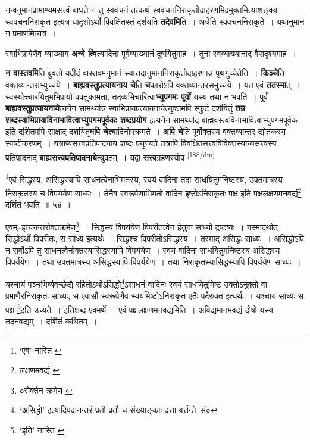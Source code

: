 \documentclass[article,12pt,a4paper]{memoir}
\begin{document}
	  \pstart नन्वनुमानप्रामाण्यमसत्त्वं बाधते न तु स्ववचनं तत्कथं स्ववचननिराकृतोदाहरणमिदमुक्तमित्याशङ्क्य स्ववचननिराकृत इत्यत्र यादृशोऽर्थो विवक्षितस्तं दर्शयति \textbf{तदेवमि}ति । अत्रेति स्ववचननिराकृते । यथानुमानं न प्रमाणमित्यत्र ।
	\pend
      

	  \pstart स्वाभिप्रायेणैव व्याख्याय \textbf{अन्ये त्वि}त्यादिना पूर्वव्याख्यानं दूषयितुमाह । तुना स्वव्याख्यानाद् वैसदृश्यमाह ।
	\pend
      

	  \pstart \textbf{न वास्तवमि}ति ब्रुवतो यदीदं वास्तवमनुमानं स्यात्तदानुमाननिराकृतोदाहरणान्न पृथगुच्येतेति । \textbf{किञ्चे}ति वक्तव्यान्तराभ्युच्चये । \textbf{बाह्यवस्तुप्रत्यायनाय चे}ति \textbf{च}कारोऽपि वक्तव्यान्तरसमुच्चये । यत एवं \textbf{ततस्मा}त् । स्वस्योच्चारयितुमभिप्रायो वक्तुकामता, तदव्यभिचारित्वा\textbf{भ्युपगमः पूर्वो} यस्य तथा न भवति । पूर्वं \textbf{बाह्यवस्तुप्रत्यायनाये}त्यनेन सामर्थ्यान्न स्वाभिप्रायप्रत्यायनायेत्युक्तमपि स्फुटं दर्शयितुं \textbf{तन्न शब्दस्याभिप्रायाविनाभावित्वाभ्युपगमपूर्वकः शब्दप्रयोग} इत्यनेन सामर्थ्याद् बाह्मवस्त्वविनाभावित्वाभ्युपगमपूर्वक इति दर्शितमपि साक्षाद् दर्शयितु\textbf{मपि चेत्या}दिनोपक्रमते । \textbf{अपि चे}ति पूर्वोक्तस्य वक्तव्यान्तर द्योतकस्य स्पष्टीकरणम् । यत्राप्यसत्त्वप्रतिपादनाय शब्दः प्रयुज्यते तत्रापि विवक्षितसत्त्वविविक्तस्यान्यसत्त्वस्य प्रतिपादनाद् \textbf{बाह्यसत्त्वप्रतिपादनाये}त्युक्तम् । यद्वा \textbf{सत्त्व}ग्रहणस्योप  \leavevmode\textsuperscript{\rmlatinfont\tiny [188/dm]} 
	  
	\footnote{‘एवं’ नास्ति \cite{dp-msB} \cite{dp-edP} \cite{dp-edH}}एवं सिद्धस्य, असिद्धस्यापि साधनत्वेनाभिमतस्य, स्वयं वादिना तदा साधयितुमनिष्टस्य, उक्तमात्रस्य निराकृतस्य च विपर्ययेण साध्यः । तेनैव स्वरूपेणाभिमतो वादिन इष्टोऽनिराकृतः पक्ष इति पक्षलक्षणमनवद्यं\footnote{लक्षणमवद्यं \cite{dp-msB} \cite{dp-edP}} दर्शितं भवति ॥ ५४ ॥ 
	  
	एवम्--इत्यनन्तरोक्तक्रमेण\footnote{०रोक्तेन क्रमेण \cite{dp-msB} \cite{dp-msC} \cite{dp-msD}} । सिद्धस्य विपर्ययेण विपरीतत्वेन हेतुना साध्यो द्रष्टव्यः । यस्मादर्थात् सिद्धोऽर्थो विपरीतः, स साध्य इत्यर्थः । सिद्धश्च विपरीतोऽसिद्धस्य । तस्माद् असिद्धः साध्यः । असिद्धोऽपि न सर्वोऽपि तु साधनत्वेनोक्तस्यासिद्धस्यापि विपर्ययेण । स्वर्य वादिना साधयितुमनिष्टस्य असिद्धस्य विपर्ययेण । तथा उक्तमात्रस्य असिद्धस्यापि विपर्ययेण । तथा निराकृतस्यासिद्धस्यापि विपर्ययेण साध्यः । 
	  
	यश्चायं पञ्चभिर्व्यवच्छेद्यै रहितोऽर्थोऽसिद्धो\footnote{‘असिद्धो’ इत्यादिपदानन्तरं \cite{dp-msA} प्रतौ \cite{dp-msD} प्रतौ च संख्याङ्काः दत्ता वर्त्तन्ते--सं०}ऽसाधनं वादिनः स्वयं साधयितुमिष्ट उक्तोऽनुक्तो वा प्रमाणैरनिराकृतः साध्यः, स एवासौ स्वरूपेणैव स्वयमिष्टोऽनिराकृत एतैः पदैरुक्त इत्यर्थः । यश्चायं साध्यः स पक्ष \footnote{‘इति’ नास्ति \cite{dp-msA} \cite{dp-msB} \cite{dp-msD} \cite{dp-edP} \cite{dp-edH} \cite{dp-edE} \cite{dp-edN}}इति उच्यते । इतिशब्द एवमर्थे । एवं पक्षलक्षणमनवद्यमिति । अविद्यमानमवद्यं दोषो यस्य तदनवद्यम् । दर्शितं कथितम् । 
	  
\end{document}
